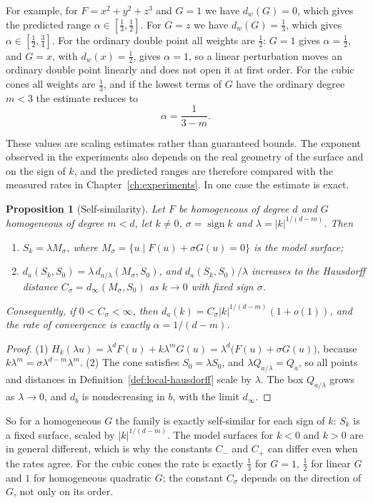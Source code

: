 \documentclass[12pt, a4paper, oneside]{book}
\theoremstyle{plain}
\newtheorem{proposition}[theorem]{Proposition}
\theoremstyle{definition}
\theoremstyle{remark}
\theoremstyle{definition}
\begin{document}
For example, for $F=x^2+y^2+z^3$ and $G=1$ we have $d_w(G)=0$, which gives the predicted range $\alpha\in[\frac13,\frac12]$. For $G=z$ we have $d_w(G)=\frac13$, which gives $\alpha\in[\frac12,\frac34]$. For the ordinary double point all weights are $\frac12$: $G=1$ gives $\alpha=\frac12$, and $G=x$, with $d_w(x)=\frac12$, gives $\alpha=1$, so a linear perturbation moves an ordinary double point linearly and does not open it at first order. For the cubic cones all weights are $\frac13$, and if the lowest terms of $G$ have the ordinary degree $m<3$ the estimate reduces to
\[
\alpha=\frac{1}{3-m}.
\]

These values are scaling estimates rather than guaranteed bounds. The exponent observed in the experiments also depends on the real geometry of the surface and on the sign of $k$, and the predicted ranges are therefore compared with the measured rates in Chapter~\ref{ch:experiments}. In one case the estimate is exact.

\begin{proposition}[Self-similarity]
\label{prop:self-similar}
Let $F$ be homogeneous of degree $d$ and $G$ homogeneous of degree $m<d$, let $k\neq0$, $\sigma=\operatorname{sign}k$ and $\lambda=|k|^{1/(d-m)}$. Then
\begin{enumerate}
    \item $S_k=\lambda M_\sigma$, where $M_\sigma=\{u \mid F(u)+\sigma G(u)=0\}$ is the \emph{model surface};
    \item $d_a(S_k,S_0)=\lambda\,d_{a/\lambda}(M_\sigma,S_0)$, and $d_a(S_k,S_0)/\lambda$ increases to the Hausdorff distance $C_\sigma=d_\infty(M_\sigma,S_0)$ as $k\to0$ with fixed sign $\sigma$.
\end{enumerate}
Consequently, if $0<C_\sigma<\infty$, then $d_a(k)=C_\sigma|k|^{1/(d-m)}(1+o(1))$, and the rate of convergence is exactly $\alpha=1/(d-m)$.
\end{proposition}

\begin{proof}
(1) $H_k(\lambda u)=\lambda^dF(u)+k\lambda^mG(u)=\lambda^d\big(F(u)+\sigma G(u)\big)$, because $k\lambda^m=\sigma\lambda^{d-m}\lambda^m$. (2) The cone satisfies $S_0=\lambda S_0$, and $\lambda Q_{a/\lambda}=Q_a$, so all points and distances in Definition~\ref{def:local-hausdorff} scale by $\lambda$. The box $Q_{a/\lambda}$ grows as $\lambda\to0$, and $d_b$ is nondecreasing in $b$, with the limit $d_\infty$.
\end{proof}

So for a homogeneous $G$ the family is exactly self-similar for each sign of $k$: $S_k$ is a fixed surface, scaled by $|k|^{1/(d-m)}$. The model surfaces for $k<0$ and $k>0$ are in general different, which is why the constants $C_-$ and $C_+$ can differ even when the rates agree. For the cubic cones the rate is exactly $\frac13$ for $G=1$, $\frac12$ for linear $G$ and $1$ for homogeneous quadratic $G$; the constant $C_\sigma$ depends on the direction of $G$, not only on its order.
\end{document}
